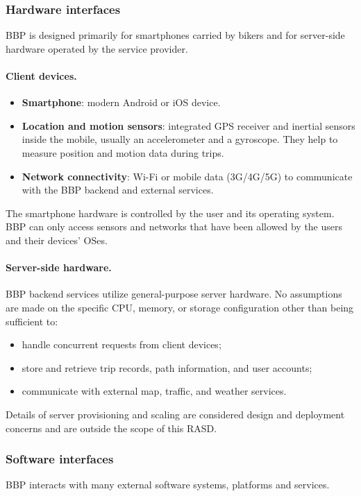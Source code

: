 \subsubsection{Hardware interfaces}
BBP is designed primarily for smartphones carried by bikers and for server-side hardware operated by
the service provider.

\paragraph{Client devices.}

\begin{itemize}[noitemsep,topsep=0.4em]
  \item \textbf{Smartphone}: modern Android or iOS device.
  \item \textbf{Location and motion sensors}: integrated GPS receiver and inertial sensors inside the mobile,
        usually an accelerometer and a gyroscope. They help to measure position and motion data during trips.
  \item \textbf{Network connectivity}: Wi-Fi or mobile data (3G/4G/5G) to communicate with the BBP backend
        and external services.
\end{itemize}

The smartphone hardware is controlled by the user and its operating system. BBP can only access sensors
and networks that have been allowed by the users and their devices' OSes.

\paragraph{Server-side hardware.}

BBP backend services utilize general-purpose server hardware. No assumptions are made on the specific CPU,
memory, or storage configuration other than being sufficient to:
\begin{itemize}[noitemsep,topsep=0.4em]
  \item handle concurrent requests from client devices;
  \item store and retrieve trip records, path information, and user accounts;
  \item communicate with external map, traffic, and weather services.
\end{itemize}

Details of server provisioning and scaling are considered design and deployment concerns and are outside
the scope of this RASD.\

\subsubsection{Software interfaces}
BBP interacts with many external software systems, platforms and services.
